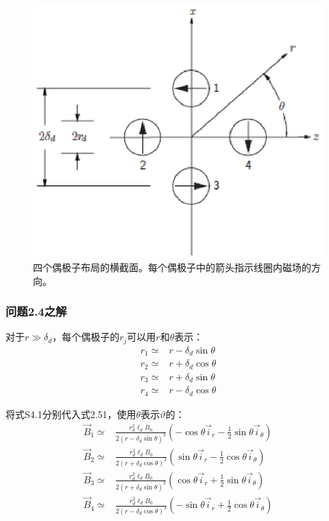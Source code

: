 \begin{figure}[htbp]
  \centering
 \includegraphics[scale=0.9]{chpt2/figs/fig2.7.eps}
  \caption{四个偶极子布局的横截面。每个偶极子中的箭头指示线圈内磁场的方向。}
\end{figure}


\subsubsection*{问题2.4之解}
对于$r\gg \delta_d$，每个偶极子的$r_j$可以用$r$和$\theta$表示：
\begin{align}
r_1\simeq& r-\delta_d \sin\theta \nonumber\tag{S4.1a}\\
r_2\simeq& r+\delta_d \cos\theta\nonumber\tag{S4.1b}\\
r_3\simeq& r+\delta_d \sin\theta\nonumber\tag{S4.1c}\\
r_4\simeq& r-\delta_d \cos\theta\nonumber\tag{S4.1d}
\end{align}

将式S4.1分别代入式2.51，使用$\theta$表示$\vartheta$的：
\begin{align}
\vec{B}_1 \simeq& \frac{r_d^2 \ell_d B_0}{2(r-\delta_d\sin\theta)^3}(-\cos\theta \vec{i}_r-\frac{1}{2}\sin\theta \vec{i}_\theta) \nonumber\tag{S4.2a}\\
\vec{B}_2 \simeq& \frac{r_d^2 \ell_d B_0}{2(r+\delta_d\cos\theta)^3}(\sin\theta \vec{i}_r-\frac{1}{2}\cos\theta \vec{i}_\theta)  \nonumber\tag{S4.2b}\\
\vec{B}_3 \simeq& \frac{r_d^2 \ell_d B_0}{2(r+\delta_d\sin\theta)^3}(\cos\theta \vec{i}_r+\frac{1}{2}\sin\theta \vec{i}_\theta) \nonumber\tag{S4.2c}\\
\vec{B}_4 \simeq& \frac{r_d^2 \ell_d B_0}{2(r-\delta_d\cos\theta)^3}(-\sin\theta \vec{i}_r+\frac{1}{2}\cos\theta \vec{i}_\theta)  \nonumber\tag{S4.2d}
\end{align}

